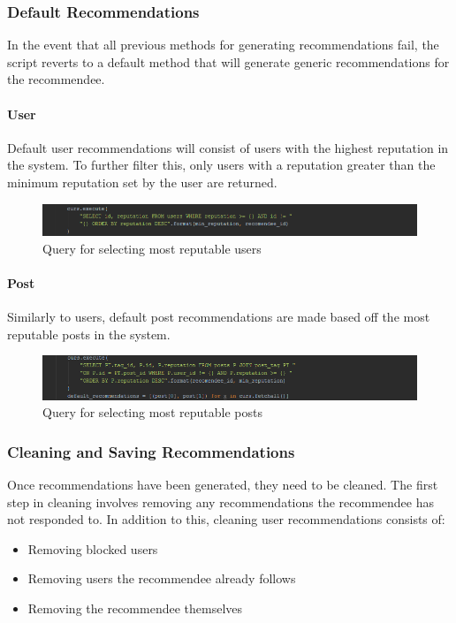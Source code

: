 \subsubsection{Default Recommendations}
In the event that all previous methods for generating recommendations fail, the script reverts to a default method that will generate generic recommendations for the recommendee. 

\paragraph{User} Default user recommendations will consist of users with the highest reputation in the system. To further filter this, only users with a reputation greater than the minimum reputation set by the user are returned.

\begin{figure}[H]
\centering
\includegraphics[width=\textwidth]{Images/Implementation/DefaultUsers}
\caption{Query for selecting most reputable users}
\label{fig:DefaultUsers}
\end{figure}

\paragraph{Post}
Similarly to users, default post recommendations are made based off the most reputable posts in the system.

\begin{figure}[H]
\centering
\includegraphics[width=\textwidth]{Images/Implementation/DefaultPosts}
\caption{Query for selecting most reputable posts}
\label{fig:DefaultPosts}
\end{figure}

\subsubsection{Cleaning and Saving Recommendations}
Once recommendations have been generated, they need to be cleaned. The first step in cleaning involves removing any recommendations the recommendee has not responded to. In addition to this, cleaning user recommendations consists of:
\begin{itemize}
\item Removing blocked users
\item Removing users the recommendee already follows
\item Removing the recommendee themselves
\end{itemize}

